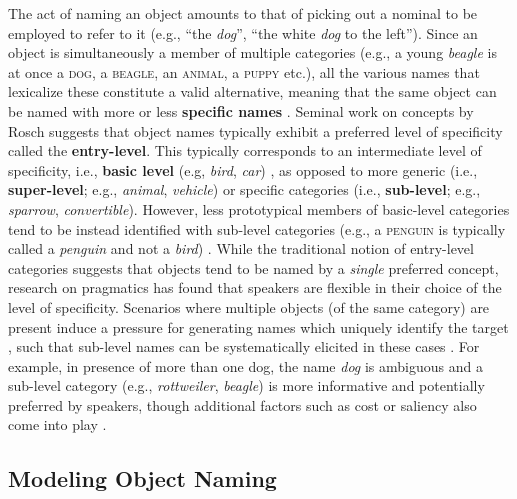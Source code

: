 \documentclass[10pt, a4paper]{article}
\newcommand{\refexp}[1]{\textsl{#1}}
\newcommand{\cat}[1]{\textsc{#1}}
\begin{document}
The act of naming an object amounts to that of picking out a nominal to be employed to refer to it (e.g., ``the \refexp{dog}'', ``the white \refexp{dog} to the left'').
Since an object is simultaneously a member of multiple categories (e.g., a young \refexp{beagle} is at once a \cat{dog}, a \cat{beagle}, an \cat{animal}, a \cat{puppy} etc.), all the various names that lexicalize these constitute a valid alternative, meaning that the same object can be named with more or less \textbf{specific names} \cite{brown1958shall,murphy2004big}. 
Seminal work on concepts by Rosch suggests that object names typically exhibit a preferred level of specificity called the \textbf{entry-level}. This typically corresponds to an intermediate level of specificity, i.e., \textbf{basic level} (e.g, \refexp{bird}, \refexp{car}) \cite{rosch1976basic}, as opposed to more generic (i.e., \textbf{super-level}; e.g., \refexp{animal}, \refexp{vehicle}) or specific categories (i.e., \textbf{sub-level}; e.g., \refexp{sparrow}, \refexp{convertible}). However, less prototypical members of basic-level categories tend to be instead identified with sub-level categories (e.g., a \cat{penguin} is typically called a \refexp{penguin} and not a \refexp{bird}) \cite{jolicoeur1984pictures}. 
While the traditional notion of entry-level categories suggests that objects tend to be named by a \refexp{single} preferred concept, research on pragmatics has found that speakers are flexible in  
their choice of the level of specificity. 
Scenarios where multiple objects (of the same category) are present induce a pressure for generating names which uniquely identify the target \cite{olson1970language}, such that sub-level names can be systematically elicited in these cases %
\cite{rohde2012communicating}\cite{graf2016animal}.
For example, in presence of more than one dog, the name \textsl{dog} is ambiguous and a sub-level category (e.g., \textsl{rottweiler}, \textsl{beagle}) is more informative and potentially preferred by speakers, though additional factors such as cost or saliency also come into play \cite{graf2016animal}\cite{clark1983common}.

\subsection{Modeling Object Naming}
\end{document}
